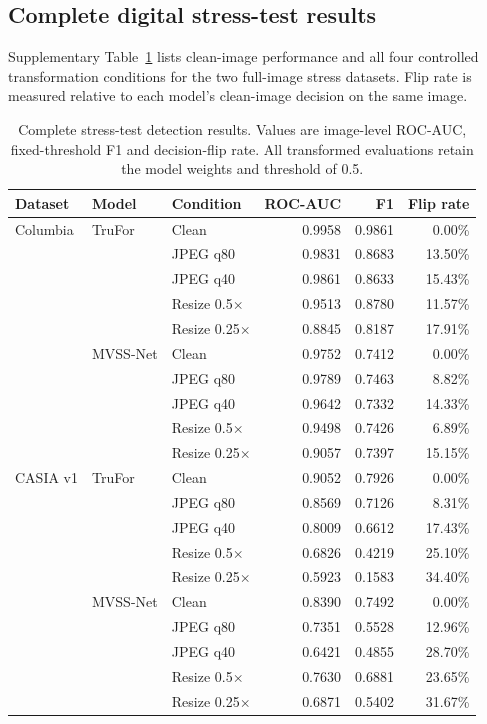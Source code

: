 \subsection{Complete digital stress-test results}
Supplementary Table~\ref{tab:stress-complete} lists clean-image performance and all four controlled transformation conditions for the two full-image stress datasets. Flip rate is measured relative to each model's clean-image decision on the same image.

\begin{table}[p]
\centering
\caption{Complete stress-test detection results. Values are image-level ROC-AUC, fixed-threshold F1 and decision-flip rate. All transformed evaluations retain the model weights and threshold of 0.5.}
\label{tab:stress-complete}
\scriptsize
\begin{tabular}{ll lrrr}
\toprule
Dataset & Model & Condition & ROC-AUC & F1 & Flip rate \\
\midrule
Columbia & TruFor & Clean & 0.9958 & 0.9861 & 0.00\% \\
 & & JPEG q80 & 0.9831 & 0.8683 & 13.50\% \\
 & & JPEG q40 & 0.9861 & 0.8633 & 15.43\% \\
 & & Resize 0.5$\times$ & 0.9513 & 0.8780 & 11.57\% \\
 & & Resize 0.25$\times$ & 0.8845 & 0.8187 & 17.91\% \\
 & MVSS-Net & Clean & 0.9752 & 0.7412 & 0.00\% \\
 & & JPEG q80 & 0.9789 & 0.7463 & 8.82\% \\
 & & JPEG q40 & 0.9642 & 0.7332 & 14.33\% \\
 & & Resize 0.5$\times$ & 0.9498 & 0.7426 & 6.89\% \\
 & & Resize 0.25$\times$ & 0.9057 & 0.7397 & 15.15\% \\
\midrule
CASIA v1 & TruFor & Clean & 0.9052 & 0.7926 & 0.00\% \\
 & & JPEG q80 & 0.8569 & 0.7126 & 8.31\% \\
 & & JPEG q40 & 0.8009 & 0.6612 & 17.43\% \\
 & & Resize 0.5$\times$ & 0.6826 & 0.4219 & 25.10\% \\
 & & Resize 0.25$\times$ & 0.5923 & 0.1583 & 34.40\% \\
 & MVSS-Net & Clean & 0.8390 & 0.7492 & 0.00\% \\
 & & JPEG q80 & 0.7351 & 0.5528 & 12.96\% \\
 & & JPEG q40 & 0.6421 & 0.4855 & 28.70\% \\
 & & Resize 0.5$\times$ & 0.7630 & 0.6881 & 23.65\% \\
 & & Resize 0.25$\times$ & 0.6871 & 0.5402 & 31.67\% \\
\bottomrule
\end{tabular}
\end{table}
